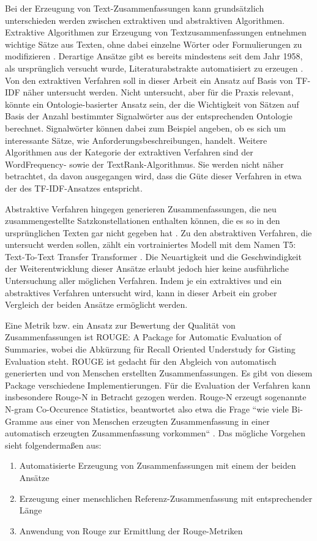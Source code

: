 Bei der Erzeugung von Text-Zusammenfassungen kann grundsätzlich unterschieden werden zwischen extraktiven und abstraktiven Algorithmen. Extraktive Algorithmen zur Erzeugung von Textzusammenfassungen entnehmen wichtige Sätze aus Texten, ohne dabei einzelne Wörter oder Formulierungen zu modifizieren \cite[S. 2]{allahyari}. Derartige Ansätze gibt es bereits mindestens seit dem Jahr 1958, als ursprünglich versucht wurde, Literaturabstrakte automatisiert zu erzeugen \cite{luhn}. Von den extraktiven Verfahren soll in dieser Arbeit ein Ansatz auf Basis von TF-IDF näher untersucht werden. Nicht untersucht, aber für die Praxis relevant, könnte ein Ontologie-basierter Ansatz sein, der die Wichtigkeit von Sätzen auf Basis der Anzahl bestimmter Signalwörter aus der entsprechenden Ontologie berechnet. Signalwörter können dabei zum Beispiel angeben, ob es sich um interessante Sätze, wie Anforderungsbeschreibungen, handelt. Weitere Algorithmen aus der Kategorie der extraktiven Verfahren sind der WordFrequency- sowie der TextRank-Algorithmus. Sie werden nicht näher betrachtet, da davon ausgegangen wird, dass die Güte dieser Verfahren in etwa der des TF-IDF-Ansatzes entspricht. 

Abstraktive Verfahren hingegen generieren Zusammenfassungen, die neu zusammengestellte Satzkonstellationen enthalten können, die es so in den ursprünglichen Texten gar nicht gegeben hat \cite[S. 258]{Gupta}. Zu den abstraktiven Verfahren, die untersucht werden sollen, zählt ein vortrainiertes Modell mit dem Namen T5: Text-To-Text Transfer Transformer \cite{Raffel}. 
Die Neuartigkeit und die Geschwindigkeit der Weiterentwicklung dieser Ansätze erlaubt jedoch hier keine ausführliche Untersuchung aller möglichen Verfahren. Indem je ein extraktives und ein abstraktives Verfahren untersucht wird, kann in dieser Arbeit ein grober Vergleich der beiden Ansätze ermöglicht werden. 

Eine Metrik bzw. ein Ansatz zur Bewertung der Qualität von Zusammenfassungen ist ROUGE: A Package for Automatic Evaluation of Summaries, wobei die Abkürzung für Recall Oriented Understudy for Gisting Evaluation steht. ROUGE ist gedacht für den Abgleich von automatisch generierten und von Menschen erstellten Zusammenfassungen. Es gibt von diesem Package verschiedene Implementierungen. Für die Evaluation der Verfahren kann insbesondere Rouge-N in Betracht gezogen werden. Rouge-N erzeugt sogenannte N-gram Co-Occurence Statistics, beantwortet also etwa die Frage ``wie viele Bi-Gramme aus einer von Menschen erzeugten Zusammenfassung in einer automatisch erzeugten Zusammenfassung vorkommen`` \cite{Lin}. Das mögliche Vorgehen sieht folgendermaßen aus: 
\begin{enumerate}
\item Automatisierte Erzeugung von Zusammenfassungen mit einem der beiden Ansätze
\item Erzeugung einer menschlichen Referenz-Zusammenfassung mit entsprechender Länge
\item Anwendung von Rouge zur Ermittlung der Rouge-Metriken 
\end{enumerate}

